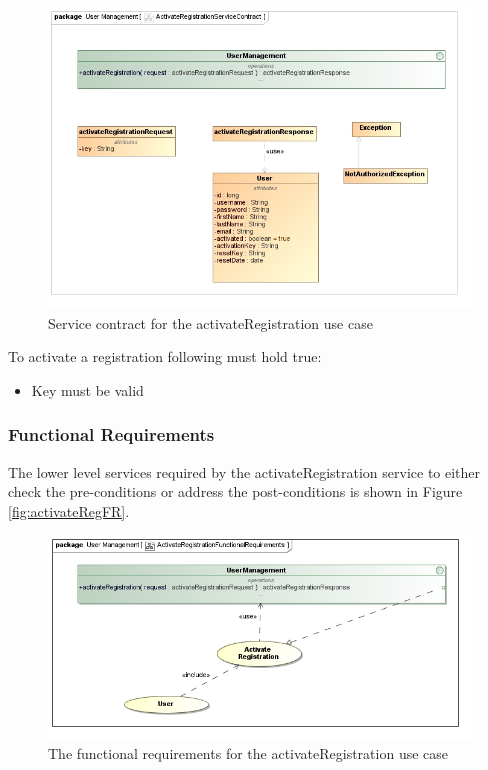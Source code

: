 \begin{figure}[H]
	\begin{center}
		\includegraphics[scale=0.55]{../Diagrams and Charts/Users/ActivateRegistrationServiceContract.jpg}
		\caption{Service contract for the activateRegistration use case}
		\label{fig:activateRegSC}
	\end{center}
\end{figure}

To activate a registration following must hold true:
\begin{itemize}
	\item Key must be valid
\end{itemize}

\subsubsection{Functional Requirements}
The lower level services required by the activateRegistration service
to either check the pre-conditions or address the post-conditions is shown
in Figure \ref{fig:activateRegFR}.

\begin{figure}[H]
	\begin{center}
		\includegraphics[scale=0.5]{../Diagrams and Charts/Users/ActivateRegistrationFunctionalRequirements.jpg}
		\caption{The functional requirements for the activateRegistration use case}
		\label{activateRegFR}
	\end{center}	
\end{figure}

